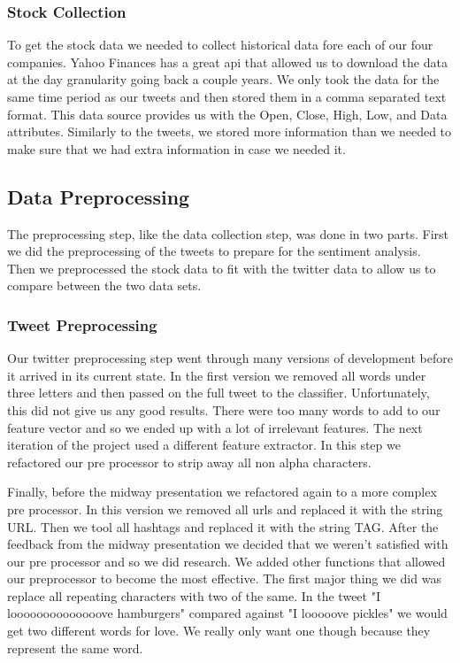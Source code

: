 \documentclass{acm_proc_article-sp}
\begin{document}
\subsubsection{Stock Collection} 

To get the stock data we needed to collect historical data fore each of our
four companies. Yahoo Finances has a great api that allowed us to download the
data at the day granularity going back a couple years. We only took the data
for the same time period as our tweets and then stored them in a comma
separated text format.  This data source provides us with the Open, Close,
High, Low, and Data attributes. Similarly to the tweets, we stored more
information than we needed to make sure that we had extra information in case
we needed it. 

\subsection{Data Preprocessing}

The preprocessing step, like the data collection step, was done in two parts.
First we did the preprocessing of the tweets to prepare for the sentiment analysis.
Then we preprocessed the stock data to fit with the twitter data to allow us to 
compare between the two data sets.

\subsubsection{Tweet Preprocessing}

Our twitter preprocessing step went through many versions of development before
it arrived in its current state. In the first version we removed all words
under three letters and then passed on the full tweet to the classifier.
Unfortunately, this did not give us any good results. There were too many words
to add to our feature vector and so we ended up with a lot of irrelevant
features. The next iteration of the project used a different feature extractor.
In this step we refactored our pre processor to strip away all non alpha
characters. 

Finally, before the midway presentation we refactored again to a
more complex pre processor. In this version we removed all urls and replaced it
with the string URL. Then we tool all hashtags and replaced it with the string
TAG. After the feedback from the midway presentation we decided that we weren't
satisfied with our pre processor and so we did research. We added other
functions that allowed our preprocessor to become the most effective. The first
major thing we did was replace all repeating characters with two of the same.
In the tweet "I loooooooooooooove hamburgers" compared against "I looooove
pickles" we would get two different words for love. We really only want one
though because they represent the same word. 
\end{document}
